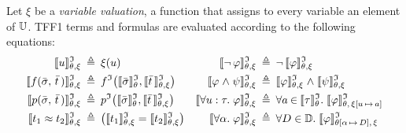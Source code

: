 Let $\xi$ be a {\em variable valuation}, a function that assigns
to every variable an element of $\univ$. TFF1 terms
and formulas are evaluated according to the following equations:
\begin{align*}
\eval{u} &\eqdef \xi(u) &
  \eval{\lnot\, \varphi} &\eqdef \lnot\, \eval{\varphi} \\
\eval{f(\bar{\sigma},\,\bar{t}\,)} &\eqdef f^\cI\bigl(\evalT{\bar{\sigma}},\eval{\bar{t}\,}\bigr) &
  \eval{\varphi \rand \psi} &\eqdef \eval{\varphi} \rand \eval{\psi} \\
\eval{p(\bar{\sigma},\,\bar{t}\,)} &\eqdef p^\cI\bigl(\evalT{\bar{\sigma}},\eval{\bar{t}\,}\bigr) &
  \eval{\forall u \ty \tau .\; \varphi} &\eqdef \forall {a \mathbin\in \evalT{\tau}} .\;
  \smash{\evalG{\varphi}_{\theta,\,\xi[u\,\mapsto\,a]}} \\
\eval{t_1 \eq t_2} &\eqdef \bigl(\eval{t_1} = \eval{t_2}\bigr) &
  \eval{\forall \alpha .\; \varphi} &\eqdef \forall {D \in \sorts} .\;
  \smash{\evalG{\varphi}_{\theta[\alpha\,\mapsto\,D],\,\xi}}
\end{align*}

